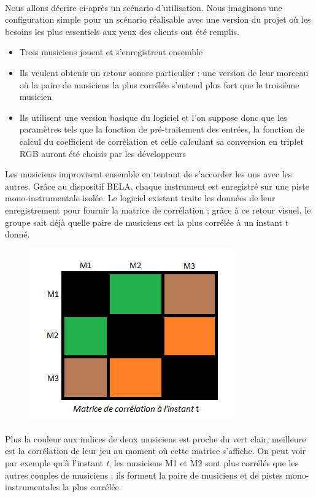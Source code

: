 \documentclass{article}
\begin{document}
\paragraph{}
Nous allons décrire ci-après un scénario d'utilisation. Nous imaginons une
configuration simple pour un scénario réalisable avec une version du projet où
les besoins les plus essentiels aux yeux des clients ont été remplis.
\begin{itemize}
 \item Trois musiciens jouent et s'enregistrent ensemble
 \item Ils veulent obtenir un retour sonore particulier : une version de leur
       morceau où la paire de musiciens la plus corrélée s'entend plus fort que le
       troisième musicien
 \item Ils utilisent une version basique du logiciel et l'on suppose donc que
       les paramètres tels que la fonction de pré-traitement des entrées, la fonction
       de calcul du coefficient de corrélation et celle calculant sa conversion en
       triplet RGB auront été choisis par les développeurs
\end{itemize}
Les musiciens improvisent ensemble en tentant de s'accorder les uns avec les
autres. Grâce au dispositif BELA, chaque instrument est enregistré sur une
piste mono-instrumentale isolée. Le logiciel existant traite les données de
leur enregistrement pour fournir la matrice de corrélation ; grâce à ce retour
visuel, le groupe sait déjà quelle paire de musiciens est la plus corrélée à
un instant t donné.
\begin{figure}[h]
 \centering
 \includegraphics[scale=0.50]{matrice_correlation.png}
\end{figure}
\paragraph{}
Plus la couleur aux indices de deux musiciens est proche du vert clair,
meilleure est la corrélation de leur jeu au moment où cette matrice s'affiche.
On peut voir par exemple qu'à l'instant \textit{t}, les musiciens M1 et M2
sont plus corrélés que les autres couples de musiciens ; ils forment la paire
de musiciens et de pistes mono-instrumentales la plus corrélée.
\end{document}
